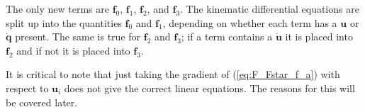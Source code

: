 \documentclass[smallcondensed,final]{svjour3}                     %
\begin{document}
The only new terms are $\mathbf{f}_0$, $\mathbf{f}_1$, $\mathbf{f}_2$, and
$\mathbf{f}_3$.
The kinematic differential equations are split up into the quantities
$\mathbf{f}_0$ and $\mathbf{f}_1$, depending on whether each term has a
$\mathbf{u}$ or $\dot{\mathbf{q}}$ present.
The same is true for $\mathbf{f}_2$ and $\mathbf{f}_3$; if a term contains a
$\dot{\mathbf{u}}$ it is placed into $\mathbf{f}_2$ and if not it is placed
into $\mathbf{f}_3$.

It is critical to note that just taking the gradient of (\ref{eq:F_Fstar_f_a})
with respect to $\mathbf{u}_i$ does not give the correct linear equations. The
reasons for this will be covered later.
\end{document}
